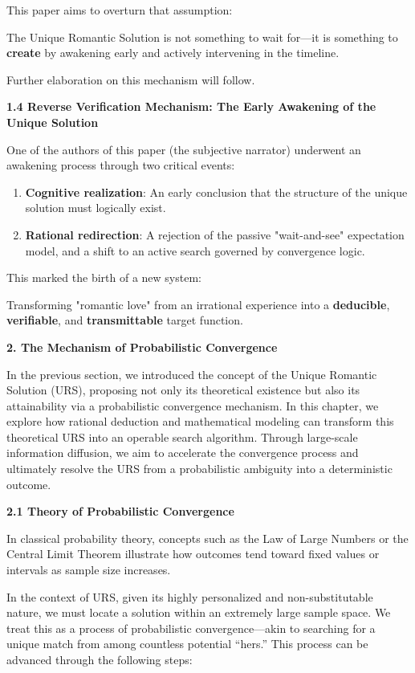 \documentclass[
]{article}
\begin{document}
This paper aims to overturn that assumption:

The Unique Romantic Solution is not something to wait for---it is
something to \textbf{create} by awakening early and actively intervening
in the timeline.

Further elaboration on this mechanism will follow.

\textbf{1.4 Reverse Verification Mechanism: The Early Awakening of the
Unique Solution}

One of the authors of this paper (the subjective narrator) underwent an
awakening process through two critical events:

\begin{enumerate}
\def\labelenumi{\arabic{enumi}.}
\item
  \textbf{Cognitive realization}: An early conclusion that the structure
  of the unique solution must logically exist.
\item
  \textbf{Rational redirection}: A rejection of the passive
  "wait-and-see" expectation model, and a shift to an active search
  governed by convergence logic.
\end{enumerate}

This marked the birth of a new system:

Transforming "romantic love" from an irrational experience into a
\textbf{deducible}, \textbf{verifiable}, and \textbf{transmittable}
target function.

\textbf{2. The Mechanism of Probabilistic Convergence}

In the previous section, we introduced the concept of the Unique
Romantic Solution (URS), proposing not only its theoretical existence
but also its attainability via a probabilistic convergence mechanism. In
this chapter, we explore how rational deduction and mathematical
modeling can transform this theoretical URS into an operable search
algorithm. Through large-scale information diffusion, we aim to
accelerate the convergence process and ultimately resolve the URS from a
probabilistic ambiguity into a deterministic outcome.

\textbf{2.1 Theory of Probabilistic Convergence}

In classical probability theory, concepts such as the Law of Large
Numbers or the Central Limit Theorem illustrate how outcomes tend toward
fixed values or intervals as sample size increases.

In the context of URS, given its highly personalized and
non-substitutable nature, we must locate a solution within an extremely
large sample space. We treat this as a process of probabilistic
convergence---akin to searching for a unique match from among countless
potential ``hers.'' This process can be advanced through the following
steps:
\end{document}
